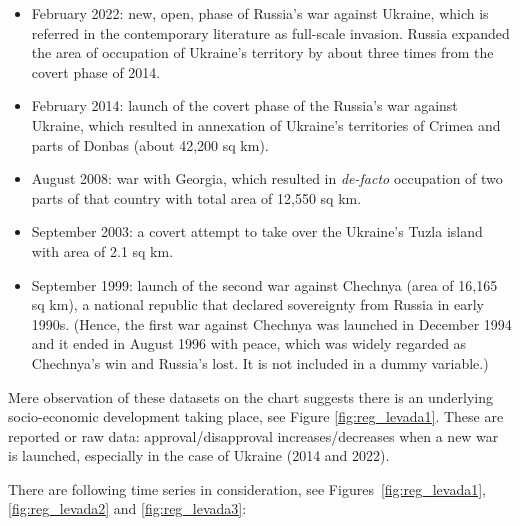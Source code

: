 \begin{itemize}
    \item February 2022: new, open, phase of Russia's war against Ukraine, which is referred in the contemporary literature as full-scale invasion. Russia expanded the area of occupation of Ukraine's territory by about three times from the covert phase of 2014.  
    \item February 2014: launch of the covert phase of the Russia's war against Ukraine, which resulted in annexation of Ukraine's territories of Crimea and parts of Donbas (about 42,200 sq km).
    \item August 2008: war with Georgia, which resulted in \textit{de-facto} occupation of two parts of that country with total area of 12,550 sq km.
    \item September 2003: a covert attempt to take over the Ukraine's Tuzla island with area of 2.1 sq km. 
    \item September 1999: launch of the second war against Chechnya (area of 16,165 sq km), a national republic that declared sovereignty from Russia in early 1990s. (Hence, the first war against Chechnya was launched in December 1994 and it ended in August 1996 with peace, which was widely regarded as Chechnya's win and Russia's lost. It is not included in a dummy variable.)
\end{itemize}

Mere observation of these datasets on the chart suggests there is an underlying socio-economic development taking place, see Figure \ref{fig:reg_levada1}. These are reported or raw data: approval/disapproval increases/decreases when a new war is launched, especially in the case of Ukraine (2014 and 2022).

There are following time series in consideration, see Figures~\ref{fig:reg_levada1}, \ref{fig:reg_levada2} and \ref{fig:reg_levada3}: 

